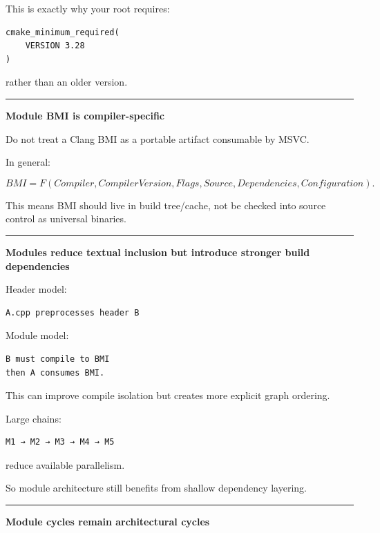 This is exactly why your root requires:

\begin{verbatim}
cmake_minimum_required(
    VERSION 3.28
)
\end{verbatim}

rather than an older version.

\begin{center}\rule{0.5\linewidth}{0.5pt}\end{center}

\textbf{Module BMI is compiler-specific}

Do not treat a Clang BMI as a portable artifact consumable by MSVC.

In general:

\[
BMI=
F(
Compiler,
CompilerVersion,
Flags,
Source,
Dependencies,
Configuration
).
\]

This means BMI should live in build tree/cache, not be checked into source control as universal binaries.

\begin{center}\rule{0.5\linewidth}{0.5pt}\end{center}

\textbf{Modules reduce textual inclusion but introduce stronger build dependencies}

Header model:

\begin{verbatim}
A.cpp preprocesses header B
\end{verbatim}

Module model:

\begin{verbatim}
B must compile to BMI
then A consumes BMI.
\end{verbatim}

This can improve compile isolation but creates more explicit graph ordering.

Large chains:

\begin{verbatim}
M1 → M2 → M3 → M4 → M5
\end{verbatim}

reduce available parallelism.

So module architecture still benefits from shallow dependency layering.

\begin{center}\rule{0.5\linewidth}{0.5pt}\end{center}

\textbf{Module cycles remain architectural cycles}

